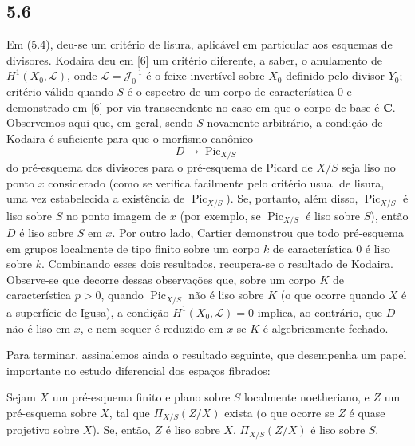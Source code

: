 \subsection*{5.6}

Em (5.4), deu-se um critério de lisura, aplicável em particular aos esquemas de
divisores. Kodaira deu em [6] um critério diferente, a saber, o anulamento de
$H^1(X_0,\mathcal L)$, onde $\mathcal L=\mathcal J_0^{-1}$ é o feixe
invertível sobre $X_0$ definido pelo divisor $Y_0$; critério válido quando $S$
é o espectro de um corpo de característica 0 e demonstrado em [6] por via
transcendente no caso em que o corpo de base é $\mathbf C$. Observemos aqui
que, em geral, sendo $S$ novamente arbitrário, a condição de Kodaira é
suficiente para que o morfismo canônico
\[
D\longrightarrow\operatorname{Pic}_{X/S}
\]
do pré-esquema dos divisores para o pré-esquema de Picard de $X/S$ seja liso
no ponto $x$ considerado (como se verifica facilmente pelo critério usual de
lisura, uma vez estabelecida a existência de $\operatorname{Pic}_{X/S}$). Se,
portanto, além disso, $\operatorname{Pic}_{X/S}$ é liso sobre $S$ no ponto
imagem de $x$ (por exemplo, se $\operatorname{Pic}_{X/S}$ é liso sobre $S$),
então $D$ é liso sobre $S$ em $x$. Por outro lado, Cartier demonstrou que todo
pré-esquema em grupos localmente de tipo finito sobre um corpo $k$ de
característica 0 é liso sobre $k$. Combinando esses dois resultados, recupera-se
o resultado de Kodaira. Observe-se que decorre dessas observações que, sobre um
corpo $K$ de característica $p>0$, quando $\operatorname{Pic}_{X/S}$ não é
liso sobre $K$ (o que ocorre quando $X$ é a superfície de Igusa), a condição
$H^1(X_0,\mathcal L)=0$ implica, ao contrário, que $D$ não é liso em $x$, e
nem sequer é reduzido em $x$ se $K$ é algebricamente fechado.

Para terminar, assinalemos ainda o resultado seguinte, que desempenha um papel
importante no estudo diferencial dos espaços fibrados:

 Sejam $X$ um pré-esquema finito e plano sobre $S$
localmente noetheriano, e $Z$ um pré-esquema sobre $X$, tal que
$\Pi_{X/S}(Z/X)$ exista (o que ocorre se $Z$ é quase projetivo sobre $X$). Se,
então, $Z$ é liso sobre $X$, $\Pi_{X/S}(Z/X)$ é liso sobre $S$.

